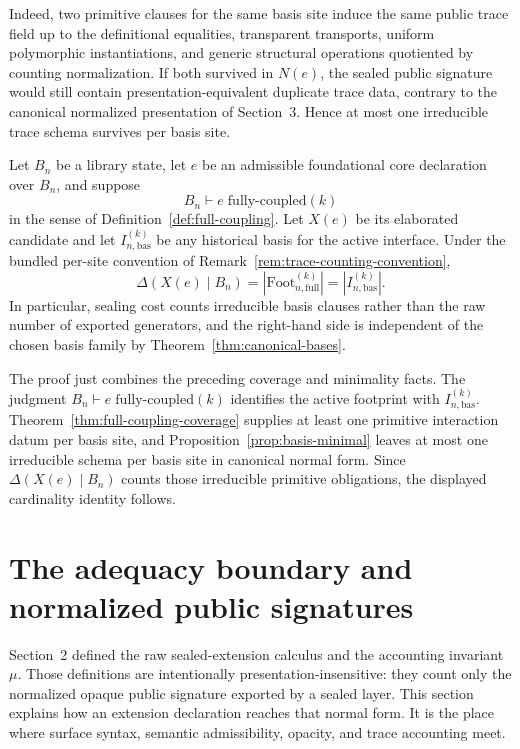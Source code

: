 \documentclass{lmcs}
\begin{document}
Indeed, two primitive clauses for the same basis site induce the same public trace field up to
the definitional equalities, transparent transports, uniform polymorphic instantiations, and
generic structural operations quotiented by counting normalization.  If both survived in
\(N(e)\), the sealed public signature would still contain presentation-equivalent duplicate
trace data, contrary to the canonical normalized presentation of Section~3.  Hence at most one
irreducible trace schema survives per basis site.

\begin{thm}
Let \(B_n\) be a library state, let \(e\) be an admissible foundational core declaration over
\(B_n\), and suppose
\[
  B_n \vdash e\;\mathrm{fully\mbox{-}coupled}(k)
\]
in the sense of Definition~\ref{def:full-coupling}.  Let \(X(e)\) be its elaborated candidate
and let \(I_{n,\mathrm{bas}}^{(k)}\) be any historical basis for the active interface.  Under the bundled
per-site convention of Remark~\ref{rem:trace-counting-convention},
\[
  \Delta(X(e)\mid B_n)
  = |\mathrm{Foot}^{(k)}_{n,\mathrm{full}}|
  = |I_{n,\mathrm{bas}}^{(k)}|.
\]
In particular, sealing cost counts irreducible basis clauses rather than the raw number of
exported generators, and the right-hand side is independent of the chosen basis family by
Theorem~\ref{thm:canonical-bases}.
\end{thm}

The proof just combines the preceding coverage and minimality facts.  The judgment
\(B_n\vdash e\;\mathrm{fully\mbox{-}coupled}(k)\) identifies the active footprint with
\(I_{n,\mathrm{bas}}^{(k)}\).  Theorem~\ref{thm:full-coupling-coverage} supplies at least one
primitive interaction datum per basis site, and Proposition~\ref{prop:basis-minimal} leaves at
most one irreducible schema per basis site in
canonical normal form.  Since \(\Delta(X(e)\mid B_n)\) counts those irreducible primitive
obligations, the displayed cardinality identity follows.


\section{The adequacy boundary and normalized public signatures}

Section~2 defined the raw sealed-extension calculus and the accounting invariant \(\mu\).
Those definitions are intentionally presentation-insensitive: they count only the normalized
opaque public signature exported by a sealed layer.  This section explains how an extension
declaration reaches that normal form.  It is the place where surface syntax, semantic
admissibility, opacity, and trace accounting meet.
\end{document}
